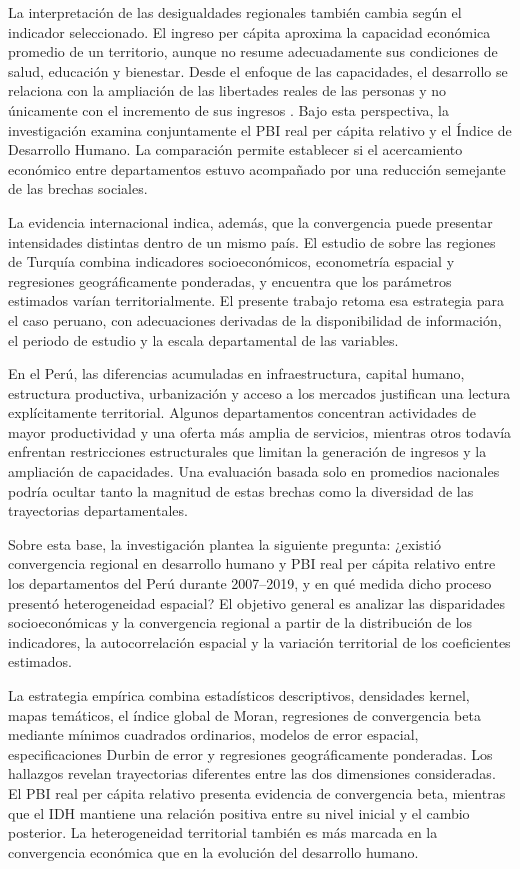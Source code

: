 La interpretación de las desigualdades regionales también cambia según el
indicador seleccionado. El ingreso per cápita aproxima la capacidad económica
promedio de un territorio, aunque no resume adecuadamente sus condiciones de
salud, educación y bienestar. Desde el enfoque de las capacidades, el
desarrollo se relaciona con la ampliación de las libertades reales de las
personas y no únicamente con el incremento de sus ingresos
\parencite{sen1999}. Bajo esta perspectiva, la investigación examina
conjuntamente el PBI real per cápita relativo y el Índice de Desarrollo Humano.
La comparación permite establecer si el acercamiento económico entre
departamentos estuvo acompañado por una reducción semejante de las brechas
sociales.

La evidencia internacional indica, además, que la convergencia puede presentar
intensidades distintas dentro de un mismo país. El estudio de
\textcite{duran2024} sobre las regiones de Turquía combina indicadores
socioeconómicos, econometría espacial y regresiones geográficamente ponderadas,
y encuentra que los parámetros estimados varían territorialmente. El presente
trabajo retoma esa estrategia para el caso peruano, con adecuaciones derivadas
de la disponibilidad de información, el periodo de estudio y la escala
departamental de las variables.

En el Perú, las diferencias acumuladas en infraestructura, capital humano,
estructura productiva, urbanización y acceso a los mercados justifican una
lectura explícitamente territorial. Algunos departamentos concentran
actividades de mayor productividad y una oferta más amplia de servicios,
mientras otros todavía enfrentan restricciones estructurales que limitan la
generación de ingresos y la ampliación de capacidades. Una evaluación basada
solo en promedios nacionales podría ocultar tanto la magnitud de estas brechas
como la diversidad de las trayectorias departamentales.

Sobre esta base, la investigación plantea la siguiente pregunta: ¿existió
convergencia regional en desarrollo humano y PBI real per cápita relativo
entre los departamentos del Perú durante 2007--2019, y en qué medida dicho
proceso presentó heterogeneidad espacial? El objetivo general es analizar las
disparidades socioeconómicas y la convergencia regional a partir de la
distribución de los indicadores, la autocorrelación espacial y la variación
territorial de los coeficientes estimados.

La estrategia empírica combina estadísticos descriptivos, densidades kernel,
mapas temáticos, el índice global de Moran, regresiones de convergencia beta
mediante mínimos cuadrados ordinarios, modelos de error espacial,
especificaciones Durbin de error y regresiones geográficamente ponderadas. Los
hallazgos revelan trayectorias diferentes entre las dos dimensiones
consideradas. El PBI real per cápita relativo presenta evidencia de
convergencia beta, mientras que el IDH mantiene una relación positiva entre su
nivel inicial y el cambio posterior. La heterogeneidad territorial también es
más marcada en la convergencia económica que en la evolución del desarrollo
humano.

